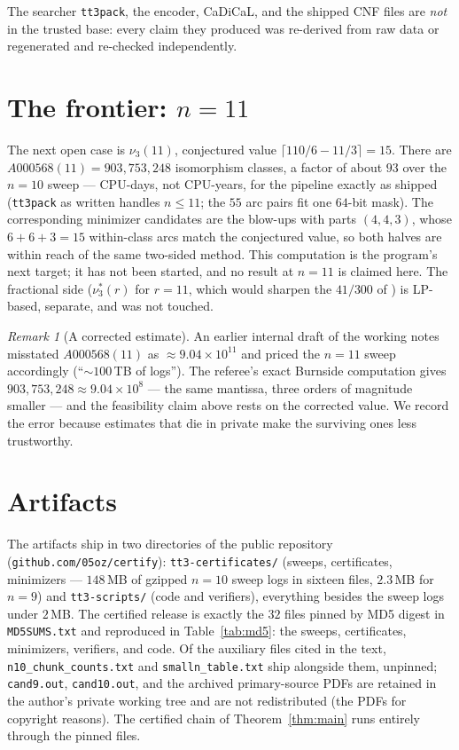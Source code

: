 \documentclass[11pt]{amsart}
\newcommand{\nut}{\nu_3}
\newcommand{\nuf}{\nu_3^{*}}
\theoremstyle{plain}
\theoremstyle{definition}
\theoremstyle{remark}
\newtheorem{remark}[theorem]{Remark}
\begin{document}
\noindent The searcher \texttt{tt3pack}, the encoder, CaDiCaL, and the
shipped CNF files are \emph{not} in the trusted base: every claim they
produced was re-derived from raw data or regenerated and re-checked
independently.

\section{The frontier: $n=11$}\label{sec:frontier}

The next open case is $\nut(11)$, conjectured value
$\lceil 110/6-11/3\rceil=15$. There are
$A000568(11)=903{,}753{,}248$ isomorphism classes, a factor of
about $93$ over the $n=10$ sweep --- CPU-days, not CPU-years, for the
pipeline exactly as shipped (\texttt{tt3pack} as written handles
$n\le11$; the $55$ arc pairs fit one $64$-bit mask). The corresponding
minimizer candidates are the blow-ups with parts $(4,4,3)$, whose
$6+6+3=15$ within-class arcs match the conjectured value, so both halves
are within reach of the same two-sided method. This
computation is the program's next target; it has not been started, and
no result at $n=11$ is claimed here. The fractional side ($\nuf(r)$ for $r=11$, which would
sharpen the $41/300$ of \cite{KY08}) is LP-based, separate, and was not
touched.

\begin{remark}[A corrected estimate]\label{rem:burnside}
An earlier internal draft of the working notes misstated $A000568(11)$
as ${\approx}9.04\times10^{11}$ and priced the $n=11$ sweep accordingly
(``${\sim}100$\,TB of logs''). The referee's exact Burnside computation
gives $903{,}753{,}248\approx9.04\times10^{8}$ --- the same mantissa,
three orders of magnitude smaller --- and the feasibility claim above
rests on the corrected value. We record the error because estimates that
die in private make the surviving ones less trustworthy.
\end{remark}

\section{Artifacts}\label{sec:artifacts}

The artifacts ship in two directories of the public repository
(\texttt{github.com/05oz/certify}): \texttt{tt3-certificates/} (sweeps,
certificates, minimizers --- $148$\,MB of gzipped $n=10$ sweep logs in
sixteen files, $2.3$\,MB for $n=9$) and \texttt{tt3-scripts/} (code and
verifiers), everything besides the sweep logs under $2$\,MB. The
certified release is exactly the $32$ files pinned by MD5
digest in \texttt{MD5SUMS.txt} and reproduced in Table~\ref{tab:md5}:
the sweeps, certificates, minimizers, verifiers, and code. Of the
auxiliary files cited in the text, \texttt{n10\_chunk\_counts.txt} and
\texttt{smalln\_table.txt} ship alongside them, unpinned;
\texttt{cand9.out}, \texttt{cand10.out}, and the archived primary-source
PDFs are retained in the author's private working tree and are not
redistributed (the PDFs for copyright reasons). The certified chain of
Theorem~\ref{thm:main} runs entirely through the pinned files.
\end{document}
